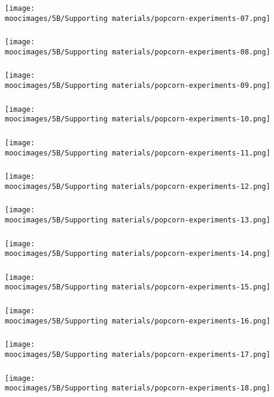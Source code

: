 \documentclass[handout,11pt,aspectratio=169,mathserif]{beamer}
\begin{document}
\begin{frame}\frametitle{}
	\centerline{\texttt{[image: \\moocimages/5B/Supporting materials/popcorn-experiments-07.png]}}
\end{frame}
\begin{frame}\frametitle{}
	\centerline{\texttt{[image: \\moocimages/5B/Supporting materials/popcorn-experiments-08.png]}}
\end{frame}
\begin{frame}\frametitle{}
	\centerline{\texttt{[image: \\moocimages/5B/Supporting materials/popcorn-experiments-09.png]}}
\end{frame}
\begin{frame}\frametitle{}
	\centerline{\texttt{[image: \\moocimages/5B/Supporting materials/popcorn-experiments-10.png]}}
\end{frame}
\begin{frame}\frametitle{}
	\centerline{\texttt{[image: \\moocimages/5B/Supporting materials/popcorn-experiments-11.png]}}
\end{frame}
\begin{frame}\frametitle{}
	\centerline{\texttt{[image: \\moocimages/5B/Supporting materials/popcorn-experiments-12.png]}}
\end{frame}
\begin{frame}\frametitle{}
	\centerline{\texttt{[image: \\moocimages/5B/Supporting materials/popcorn-experiments-13.png]}}
\end{frame}
\begin{frame}\frametitle{}
	\centerline{\texttt{[image: \\moocimages/5B/Supporting materials/popcorn-experiments-14.png]}}
\end{frame}
\begin{frame}\frametitle{}
	\centerline{\texttt{[image: \\moocimages/5B/Supporting materials/popcorn-experiments-15.png]}}
\end{frame}
\begin{frame}\frametitle{}
	\centerline{\texttt{[image: \\moocimages/5B/Supporting materials/popcorn-experiments-16.png]}}
\end{frame}
\begin{frame}\frametitle{}
	\centerline{\texttt{[image: \\moocimages/5B/Supporting materials/popcorn-experiments-17.png]}}
\end{frame}
\begin{frame}\frametitle{}
	\centerline{\texttt{[image: \\moocimages/5B/Supporting materials/popcorn-experiments-18.png]}}
\end{frame}
\end{document}
